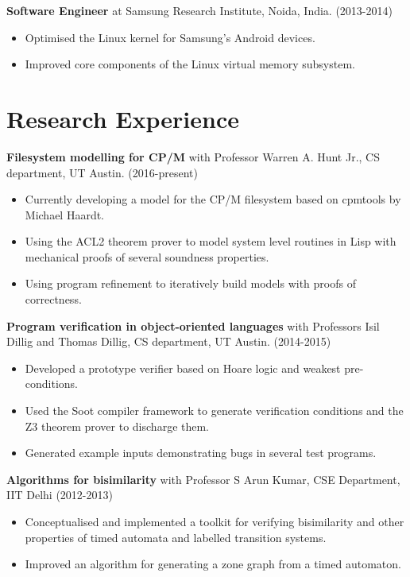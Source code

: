 \documentclass[margin]{res}
\begin{document}
\begin{resume}
 {\bf Software Engineer} at Samsung Research Institute, Noida, India. \hfill (2013-2014)
 \begin{itemize} \itemsep -2pt  %
 \item Optimised the Linux kernel for Samsung's
   Android devices.
 \item Improved core components of the Linux virtual memory subsystem.
 \end{itemize}

\section{Research Experience}
 
 {\bf Filesystem modelling for CP/M} with Professor Warren A. Hunt Jr., CS department, UT Austin. \hfill (2016-present)
 \begin{itemize} \itemsep -2pt  %
 \item Currently developing a model for the CP/M filesystem based on
   cpmtools by Michael Haardt.
 \item Using the ACL2 theorem prover to model system level routines in
   Lisp with mechanical proofs of several soundness properties.
 \item Using program refinement to iteratively build models with
   proofs of correctness.
 \end{itemize}

 
 {\bf Program verification in object-oriented languages} with Professors Isil Dillig and Thomas
 Dillig, CS department, UT Austin. \hfill (2014-2015)
 \begin{itemize} \itemsep -2pt  %
 \item Developed a prototype verifier based on Hoare logic and weakest
   pre-conditions.
 \item Used the Soot compiler framework to generate
   verification conditions and the Z3 theorem prover to discharge them.
 \item Generated example
   inputs demonstrating bugs in several test programs.
 \end{itemize}

        {\bf Algorithms for bisimilarity} with Professor S
        Arun Kumar, CSE Department, IIT Delhi    \hfill
        (2012-2013) 
        \begin{itemize} \itemsep -2pt
        \item Conceptualised and implemented a toolkit for
          verifying bisimilarity and other properties of timed automata
          and labelled transition systems.
        \item Improved an algorithm for generating a zone
          graph from a timed automaton.


\end{itemize}
\end{resume}
\end{document}
